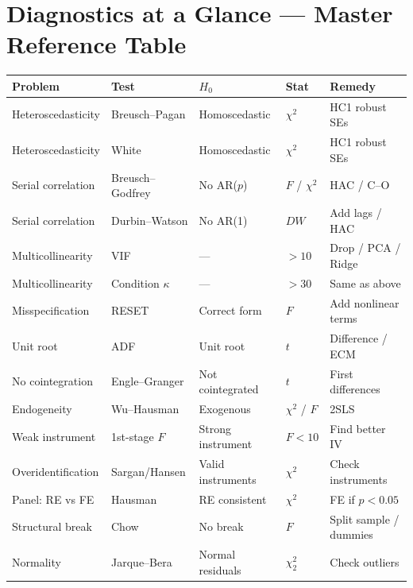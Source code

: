 \documentclass[10pt,a4paper]{article}
\begin{document}
\section{Diagnostics at a Glance --- Master Reference Table}

\small
\begin{tabularx}{\linewidth}{llXll}
\toprule
\rowcolor{NavyBlue}
\color{white}\textbf{Problem} &
\color{white}\textbf{Test} &
\color{white}\textbf{$H_0$} &
\color{white}\textbf{Stat} &
\color{white}\textbf{Remedy} \\
\midrule
Heteroscedasticity & Breusch--Pagan & Homoscedastic & $\chi^2$ & HC1 robust SEs \\
\rowcolor{RowGray}
Heteroscedasticity & White & Homoscedastic & $\chi^2$ & HC1 robust SEs \\
Serial correlation & Breusch--Godfrey & No AR($p$) & $F$ / $\chi^2$ & HAC / C--O \\
\rowcolor{RowGray}
Serial correlation & Durbin--Watson & No AR(1) & $DW$ & Add lags / HAC \\
Multicollinearity & VIF & --- & $>10$ & Drop / PCA / Ridge \\
\rowcolor{RowGray}
Multicollinearity & Condition $\kappa$ & --- & $>30$ & Same as above \\
Misspecification & RESET & Correct form & $F$ & Add nonlinear terms \\
\rowcolor{RowGray}
Unit root & ADF & Unit root & $t$ & Difference / ECM \\
No cointegration & Engle--Granger & Not cointegrated & $t$ & First differences \\
\rowcolor{RowGray}
Endogeneity & Wu--Hausman & Exogenous & $\chi^2$ / $F$ & 2SLS \\
Weak instrument & 1st-stage $F$ & Strong instrument & $F < 10$ & Find better IV \\
\rowcolor{RowGray}
Overidentification & Sargan/Hansen & Valid instruments & $\chi^2$ & Check instruments \\
Panel: RE vs FE & Hausman & RE consistent & $\chi^2$ & FE if $p < 0.05$ \\
\rowcolor{RowGray}
Structural break & Chow & No break & $F$ & Split sample / dummies \\
Normality & Jarque--Bera & Normal residuals & $\chi^2_2$ & Check outliers \\
\bottomrule
\end{tabularx}
\end{document}
